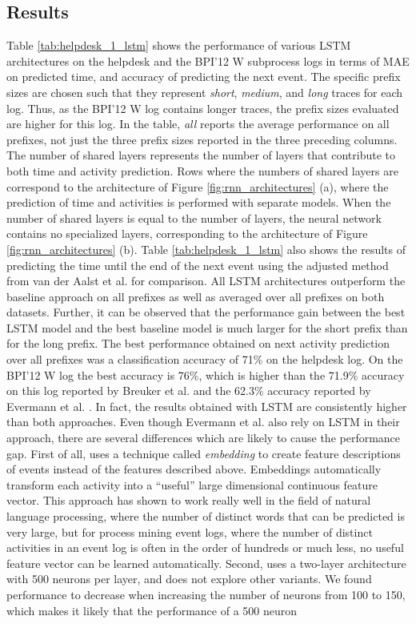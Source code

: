 \documentclass[runningheads,a4paper]{llncs}
\begin{document}
\subsection{Results}
Table \ref{tab:helpdesk_1_lstm} shows the performance of various LSTM architectures on the helpdesk and the BPI'12 W subprocess logs in terms of MAE on predicted time, and accuracy of predicting the next event. The specific prefix sizes are chosen such that they represent \emph{short}, \emph{medium}, and \emph{long} traces for each log. Thus, as the BPI'12 W log contains longer traces, the prefix sizes evaluated are higher for this log. In the table, \emph{all} reports the average performance on all prefixes, not just the three prefix sizes reported in the three preceding columns. The number of shared layers represents the number of layers that contribute to both time and activity prediction. Rows where the numbers of shared layers are  correspond to the architecture of Figure \ref{fig:rnn_architectures} (a), where the prediction of time and activities is performed with separate models. When the number of shared layers is equal to the number of layers, the neural network contains no specialized layers, corresponding to the architecture of Figure \ref{fig:rnn_architectures} (b). Table  \ref{tab:helpdesk_1_lstm} also shows the results of predicting the time until the end of the next event using the adjusted method from van der Aalst et al. \cite{Aalst2011} for comparison. All LSTM architectures outperform the baseline approach on all prefixes as well as averaged over all prefixes on both datasets. Further, it can be observed that the performance gain between the best LSTM model and the best baseline model is much larger for the short prefix than for the long prefix. The best performance obtained on next activity prediction over all prefixes was a classification accuracy of 71\% on the helpdesk log. On the BPI'12 W log the best accuracy is 76\%, which is higher than the 71.9\% accuracy on this log reported by Breuker et al. \cite{Breuker2016} and the 62.3\% accuracy reported by Evermann et al. \cite{Evermann2016}. In fact, the results obtained with LSTM are consistently higher than both approaches. Even though Evermann et al. \cite{Evermann2016} also rely on LSTM in their approach, there are several differences which are likely to cause the performance gap. First of all, \cite{Evermann2016} uses a technique called \emph{embedding} \cite{Mikolov2013} to create feature descriptions of events instead of the features described above. Embeddings automatically transform each activity into a ``useful'' large dimensional continuous feature vector. This approach has shown to work really well in the field of natural language processing, where the number of distinct words that can be predicted is very large, but for process mining event logs, where the number of distinct activities in an event log is often in the order of hundreds or much less, no useful feature vector can be learned automatically. Second, \cite{Evermann2016} uses a two-layer architecture with 500 neurons per layer, and does not explore other variants. We found performance to decrease when increasing the number of neurons from 100 to 150, which makes it likely that the performance of a 500 neuron 
\end{document}
